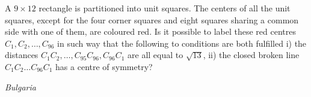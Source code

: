 A  $ 9 \times 12$ rectangle is partitioned into unit squares. The centers of all the unit squares, except for the four corner squares and eight squares sharing a common side with one of them, are coloured red. Is it possible to label these red centres $ C_1,C_2,\ldots ,C_{96}$ in such way that the following to conditions are both fulfilled
i) the distances $C_1C_2,\ldots ,C_{95}C_{96}, C_{96}C_{1}$ are all equal to $ \sqrt {13}$,
ii) the closed broken line $ C_1C_2\ldots C_{96}C_1$ has a centre of symmetry?

\textit{Bulgaria}